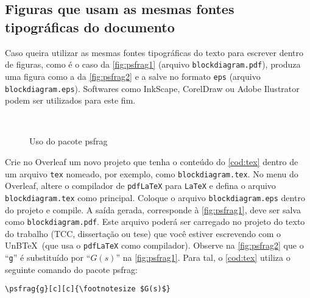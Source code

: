 
\subsection{Figuras que usam as mesmas fontes tipográficas do documento}

Caso queira utilizar as mesmas fontes tipográficas do texto para escrever dentro de figuras, como é o caso da \cref{fig:psfrag1} (arquivo \texttt{blockdiagram.pdf}), produza uma figura como a da \cref{fig:psfrag2} e a salve no formato \texttt{eps} (arquivo \texttt{blockdiagram.eps}). Softwares como InkScape, CorelDraw ou Adobe Ilustrator podem ser utilizados para este fim.

\begin{figure}[htb]
    \centering
    \caption{Uso do pacote \textsf{psfrag}}
      \\
    \label{fig:psgrag}
\end{figure}

Crie no Overleaf um novo projeto que tenha o conteúdo do \cref{cod:tex} dentro de um arquivo \texttt{tex} nomeado, por exemplo, como \texttt{blockdiagram.tex}. No menu do Overleaf, altere o compilador de \texttt{pdfLaTeX} para \texttt{LaTeX} e defina o arquivo \texttt{blockdiagram.tex} como principal. Coloque o arquivo \texttt{blockdiagram.eps} dentro do projeto e compile. A saída gerada, corresponde à \cref{fig:psfrag1}, deve ser salva como \texttt{blockdiagram.pdf}. Este arquivo poderá ser carregado no projeto do texto do trabalho (TCC, dissertação ou tese) que você estiver escrevendo com o UnB\TeX\ (que usa o \texttt{pdfLaTeX} como compilador). Observe na \cref{fig:psfrag2} que o ``\texttt{g}'' é substituído por ``$G(s)$'' na \cref{fig:psfrag1}. Para tal, o \cref{cod:tex} utiliza o seguinte comando do pacote \textsf{psfrag}:
\begin{verbatim}
\psfrag{g}[c][c]{\footnotesize $G(s)$}
\end{verbatim}

